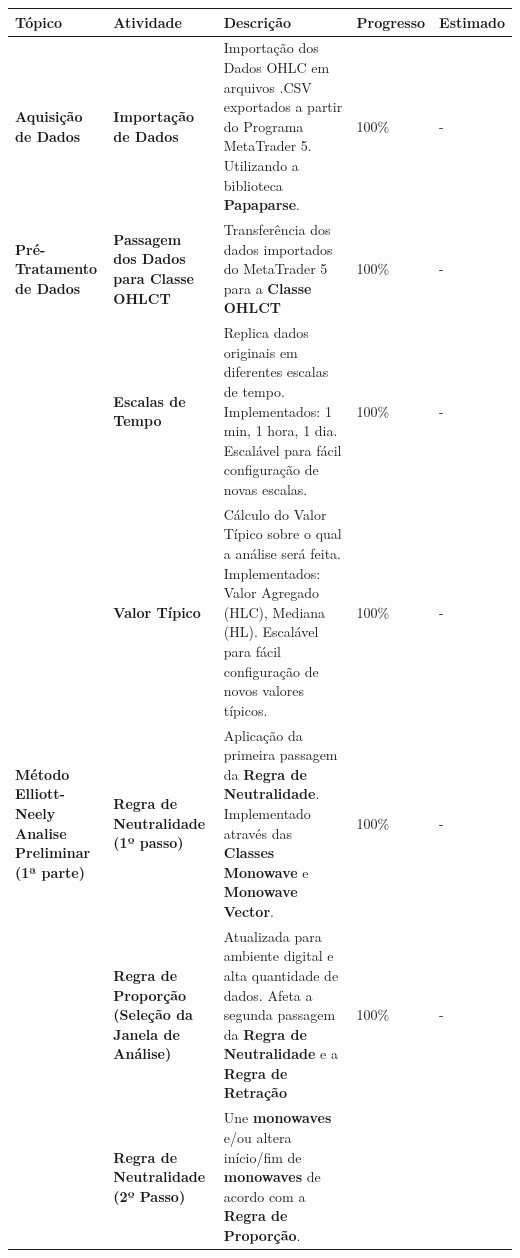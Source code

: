 \documentclass[12pt]{article}
\begin{document}
\begingroup
\renewcommand*{\arraystretch}{1.5}
\begin{table}[H]
\centering
\scriptsize
\begin{tabular}{|L{3cm}|L{2cm}|L{5cm}|R{1.4cm}|R{1.4cm}|}
	\hline
	\textbf{Tópico} & \textbf{Atividade} & \textbf{Descrição} & \textbf{Progresso} & \textbf{Estimado} \\
	\hline
	\hline
	\textbf{Aquisição de Dados}
		& \textbf{Importação de Dados}
		& 	Importação dos Dados OHLC em arquivos .CSV exportados a partir do Programa MetaTrader 5. \newline
			Utilizando a biblioteca \textbf{Papaparse}.
		& 100\%
		& - \\
	\hline
	\textbf{Pré-Tratamento de Dados}
		& \textbf{Passagem dos Dados para Classe OHLCT}
		& Transferência dos dados importados do MetaTrader 5 para a \textbf{Classe OHLCT}
		& 100\%
		& - \\
		& \textbf{Escalas de Tempo}
		&	Replica dados originais em diferentes escalas de tempo. \newline
			Implementados: 1 min, 1 hora, 1 dia. \newline
			Escalável para fácil configuração de novas escalas.
		& 100\%
		& - \\
		& \textbf{Valor Típico}
		&	Cálculo do Valor Típico sobre o qual a análise será feita. \newline
			Implementados: Valor Agregado (HLC), Mediana (HL). \newline
			Escalável para fácil configuração de novos valores típicos.
		& 100\%
		& - \\
	\hline
	\textbf{Método Elliott-Neely \newline Analise Preliminar \newline (1ª parte)}
		& \textbf{Regra de Neutralidade (1º passo)}
		&	Aplicação da primeira passagem da \textbf{Regra de Neutralidade}. \newline
			Implementado através das \textbf{Classes Monowave} e \textbf{Monowave Vector}.
		& 100\%
		& - \\
		& \textbf{Regra de Proporção \newline (Seleção da Janela de Análise)}
		&	Atualizada para ambiente digital e alta quantidade de dados. \newline
			Afeta a segunda passagem da \textbf{Regra de Neutralidade} e a \textbf{Regra de Retração}
		& 100\%
		& - \\
		& \textbf{Regra de Neutralidade (2º Passo)}
		& Une \textbf{monowaves} e/ou altera início/fim de \textbf{monowaves} de acordo com a \textbf{Regra de Proporção}.

\end{tabular}
\end{table}
\end{document}
